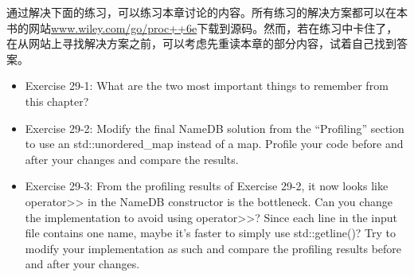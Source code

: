 通过解决下面的练习，可以练习本章讨论的内容。所有练习的解决方案都可以在本书的网站\url{www.wiley.com/go/proc++6e}下载到源码。然而，若在练习中卡住了，在从网站上寻找解决方案之前，可以考虑先重读本章的部分内容，试着自己找到答案。

\begin{itemize}
\item
Exercise 29-1: What are the two most important things to remember from this chapter?

\item
Exercise 29-2: Modify the final NameDB solution from the “Profiling” section to use an std::unordered\_map instead of a map. Profile your code before and after your changes and compare the results.

\item
Exercise 29-3: From the profiling results of Exercise 29-2, it now looks like operator>{}> in the NameDB constructor is the bottleneck. Can you change the implementation to avoid using operator>{}>? Since each line in the input file contains one name, maybe it’s faster to simply use std::getline()? Try to modify your implementation as such and compare the profiling results before and after your changes.
\end{itemize}






